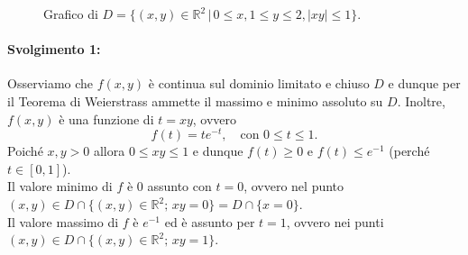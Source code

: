 \begin{example}
\begin{figure}[ht]
		\caption{Grafico di $D=\{(x,y)\in\mathbb{R}^2\,|\, 0\leq x, 1\leq y\leq2,|xy|\leq 1\}$.}
		\label{fig:vincolo_3}
	\end{figure}
	\paragraph{Svolgimento 1:} Osserviamo che $f(x,y)$ è continua sul dominio limitato e chiuso $D$ e dunque per il Teorema di Weierstrass ammette il massimo e minimo assoluto su $D$. Inoltre, $f(x,y)$ è una funzione di $t=xy$, ovvero
	\begin{equation*}
		f(t)=te^{-t},\quad\text{con } 0\leq t\leq 1.
	\end{equation*}
	Poiché $x,y>0$ allora $0\leq xy\leq 1$ e dunque $f(t)\geq 0$ e $f(t)\leq e^{-1}$ (perché $t\in[0,1]$).\\
	Il valore minimo di $f$ è 0 assunto con $t=0$, ovvero nel punto $(x,y)\in D\cap\{(x,y)\in\mathbb{R}^2;\, xy=0\}=D\cap\{x=0\}$.\\
	Il valore massimo di $f$ è $e^{-1}$ ed è assunto per $t=1$, ovvero nei punti $(x,y)\in D\cap\{(x,y)\in\mathbb{R}^2;\, xy=1\}$.

\end{example}
